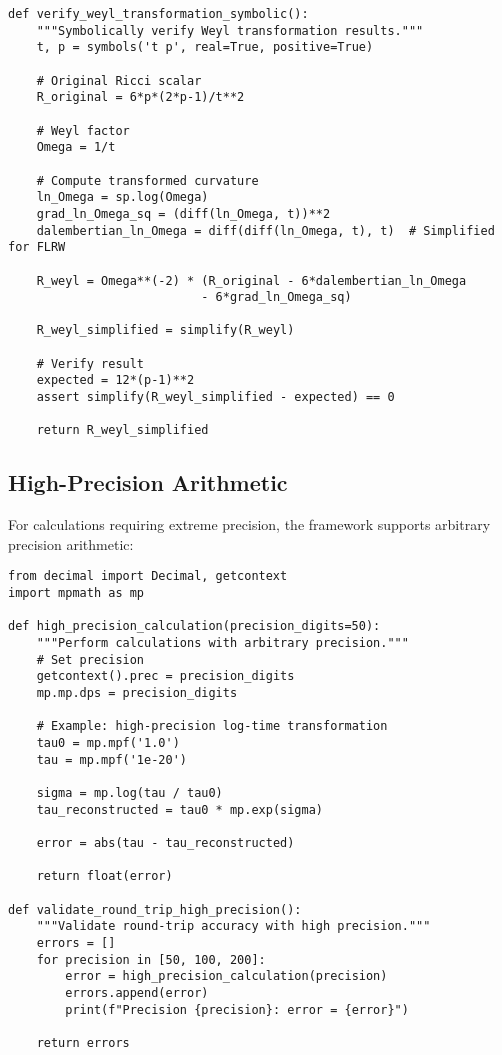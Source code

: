 \begin{verbatim}
def verify_weyl_transformation_symbolic():
    """Symbolically verify Weyl transformation results."""
    t, p = symbols('t p', real=True, positive=True)
    
    # Original Ricci scalar
    R_original = 6*p*(2*p-1)/t**2
    
    # Weyl factor
    Omega = 1/t
    
    # Compute transformed curvature
    ln_Omega = sp.log(Omega)
    grad_ln_Omega_sq = (diff(ln_Omega, t))**2
    dalembertian_ln_Omega = diff(diff(ln_Omega, t), t)  # Simplified for FLRW
    
    R_weyl = Omega**(-2) * (R_original - 6*dalembertian_ln_Omega 
                           - 6*grad_ln_Omega_sq)
    
    R_weyl_simplified = simplify(R_weyl)
    
    # Verify result
    expected = 12*(p-1)**2
    assert simplify(R_weyl_simplified - expected) == 0
    
    return R_weyl_simplified
\end{verbatim}

\subsection{High-Precision Arithmetic}
\label{app:high_precision}

For calculations requiring extreme precision, the framework supports arbitrary precision arithmetic:

\begin{verbatim}
from decimal import Decimal, getcontext
import mpmath as mp

def high_precision_calculation(precision_digits=50):
    """Perform calculations with arbitrary precision."""
    # Set precision
    getcontext().prec = precision_digits
    mp.mp.dps = precision_digits
    
    # Example: high-precision log-time transformation
    tau0 = mp.mpf('1.0')
    tau = mp.mpf('1e-20')
    
    sigma = mp.log(tau / tau0)
    tau_reconstructed = tau0 * mp.exp(sigma)
    
    error = abs(tau - tau_reconstructed)
    
    return float(error)

def validate_round_trip_high_precision():
    """Validate round-trip accuracy with high precision."""
    errors = []
    for precision in [50, 100, 200]:
        error = high_precision_calculation(precision)
        errors.append(error)
        print(f"Precision {precision}: error = {error}")
    
    return errors
\end{verbatim}

